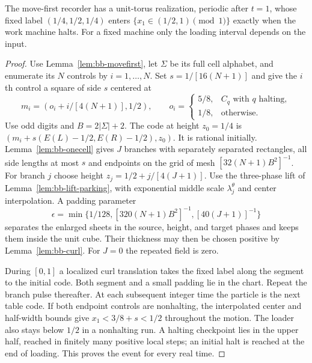 \begin{proposition}\label{thm:bb-torus33}
The move-first recorder has a unit-torus realization, periodic after
$t=1$, whose fixed label $(1/4,1/2,1/4)$ enters
$\{x_1\in(1/2,1)\pmod1\}$ exactly when the work machine halts.
For a fixed machine only the loading interval depends on the input.
\end{proposition}
\begin{proof}\label{proof:bb-torus33}
Use Lemma~\ref{lem:bb-movefirst}, let $\Sigma$ be its full cell alphabet,
and enumerate its $N$ controls by $i=1,\ldots,N$.
Set $s=1/[16(N+1)]$ and give the $i$th control a square
of side $s$ centered at
\[
 m_i=(o_i+i/[4(N+1)],1/2),\qquad
 o_i=\begin{cases}5/8,&C_q\text{ with }q\text{ halting},\\1/8,&\text{otherwise}.
 \end{cases}
\]
Use odd digits and $B=2|\Sigma|+2$.  The code at height $z_0=1/4$
is $(m_i+s(E(L)-1/2,E(R)-1/2),z_0)$.
It is rational initially.  Lemma~\ref{lem:bb-onecell} gives $J$
branches with separately separated rectangles, all side lengths at
most $s$ and endpoints on the grid of mesh
$[32(N+1)B^2]^{-1}$.  For branch $j$ choose height
$z_j=1/2+j/[4(J+1)]$.  Use the three-phase lift of
Lemma~\ref{lem:bb-lift-parking}, with exponential middle scale
$\lambda_j^\theta$ and center interpolation.  A padding parameter
\[
 \epsilon=\min\{1/128,[320(N+1)B^2]^{-1},[40(J+1)]^{-1}\}
\]
separates the enlarged sheets in the source, height, and target phases
and keeps them inside the unit cube.  Their thickness may then be
chosen positive by Lemma~\ref{lem:bb-curl}.  For $J=0$ the repeated
field is zero.

During $[0,1]$ a localized curl translation takes the fixed label
along the segment to the initial code.  Both segment and a small
padding lie in the chart.  Repeat the branch pulse thereafter.
At each subsequent integer time the particle is the next table code.
If both endpoint controls are nonhalting, the interpolated center and
half-width bounds give $x_1<3/8+s<1/2$ throughout the motion.
The loader also stays below $1/2$ in a nonhalting run.  A halting
checkpoint lies in the upper half, reached in finitely many positive
local steps; an initial halt is reached at the end of loading.
This proves the event for every real time.
\end{proof}

